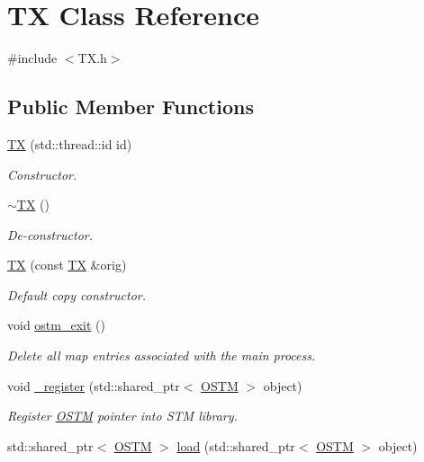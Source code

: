 \hypertarget{class_t_x}{}\section{TX Class Reference}
\label{class_t_x}


{\ttfamily \#include $<$T\+X.\+h$>$}

\subsection*{Public Member Functions}
\begin{DoxyCompactItemize}
\item 
\hyperlink{class_t_x_a8a4b83eab0171ae834bfa92bbced1094}{TX} (std\+::thread\+::id id)
\begin{DoxyCompactList}\small\item\em Constructor. \end{DoxyCompactList}\item 
\hyperlink{class_t_x_abecf854cc3228ab6dd51175b3cd1c70a}{$\sim$\+TX} ()
\begin{DoxyCompactList}\small\item\em De-\/constructor. \end{DoxyCompactList}\item 
\hyperlink{class_t_x_ab96b3dd2bfd621b47307f0af3ec4f35c}{TX} (const \hyperlink{class_t_x}{TX} \&orig)
\begin{DoxyCompactList}\small\item\em Default copy constructor. \end{DoxyCompactList}\item 
void \hyperlink{class_t_x_aa9739c5c2077454c779098db7baefc2b}{ostm\+\_\+exit} ()
\begin{DoxyCompactList}\small\item\em Delete all map entries associated with the main process. \end{DoxyCompactList}\item 
void \hyperlink{class_t_x_abc32af2f51df97ac483e5bfe7db6ca6e}{\+\_\+register} (std\+::shared\+\_\+ptr$<$ \hyperlink{class_o_s_t_m}{O\+S\+TM} $>$ object)
\begin{DoxyCompactList}\small\item\em Register \hyperlink{class_o_s_t_m}{O\+S\+TM} pointer into S\+TM library. \end{DoxyCompactList}\item 
std\+::shared\+\_\+ptr$<$ \hyperlink{class_o_s_t_m}{O\+S\+TM} $>$ \hyperlink{class_t_x_a1d78262b8831ddd042ed491f2e600e24}{load} (std\+::shared\+\_\+ptr$<$ \hyperlink{class_o_s_t_m}{O\+S\+TM} $>$ object)

\end{DoxyCompactItemize}
